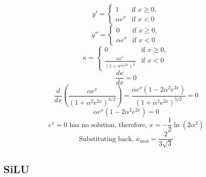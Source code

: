 \documentclass[manuscript, screen, review]{jair}
\begin{document}
 \begin{displaymath}
  y' = \begin{cases}
  1 & \text{if } x \geq 0, \\
  \alpha e^x & \text{if } x < 0
\end{cases}
 \end{displaymath}
\begin{displaymath}
  y'' = \begin{cases}
  0 & \text{if } x \geq 0, \\
  \alpha e^x & \text{if } x < 0
\end{cases}
\end{displaymath}
\begin{displaymath}
  \kappa = \begin{cases}
  0 & \text{if } x \geq 0, \\
  \frac{\alpha e^x}{(1 + \alpha^2 e^{2x})^\frac{3}{2}}  & \text{if } x < 0
\end{cases}
\end{displaymath}
\begin{displaymath}
  \frac{d \kappa}{dx} = 0
\end{displaymath}
\begin{displaymath}
  \frac{d}{dx} \left( \frac{\alpha e^x}{(1 + \alpha^2 e^{2x})^{3/2}} \right)
= \frac{\alpha e^x \left( 1 - 2 \alpha^2 e^{2x} \right)}{(1 + \alpha^2 e^{2x})^{5/2}} = 0
\end{displaymath}
\begin{displaymath}
  \alpha e^x \left( 1 - 2 \alpha^2 e^{2x} \right) = 0
\end{displaymath}
\begin{displaymath}
  e^x = 0 \text{ has no solution} \text{, therefore, } x = -\frac{1}{2} \ln(2 \alpha^2)
\end{displaymath}
\begin{displaymath}
  \text{Substituting back, }\kappa_{\text{max}} = \frac{2}{3\sqrt3}
\end{displaymath}

\subsection{SiLU}\label{app:silu}
\end{document}
